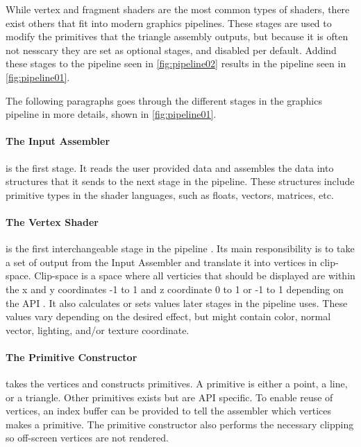 While vertex and fragment shaders are the most common types of shaders, there exist others that fit into modern graphics pipelines.
These stages are used to modify the primitives that the triangle assembly outputs, but because it is often not nesscary they are set as optional stages, and disabled per default.
Addind these stages to the pipeline seen in \cref{fig:pipeline02} results in the pipeline seen in \cref{fig:pipeline01}.



The following paragraphs goes through the different stages in the graphics pipeline in more details, shown in \cref{fig:pipeline01}.

\paragraph{The Input Assembler} is the first stage. 
It reads the user provided data and assembles the data into structures that it sends to the next stage in the pipeline. 
These structures include primitive types in the shader languages, such as floats, vectors, matrices, etc.

\paragraph{The Vertex Shader} is the first interchangeable stage in the pipeline .
Its main responsibility is to take a set of output from the Input Assembler and translate it into vertices in clip-space.
Clip-space is a space where all verticies that should be displayed are within the x and y coordinates -1 to 1 and z coordinate 0 to 1 or -1 to 1 depending on the \gls{API} .
It also calculates or sets values later stages in the pipeline uses.
These values vary depending on the desired effect, but might contain color, normal vector, lighting, and/or texture coordinate.

\paragraph{The Primitive Constructor} takes the vertices and constructs primitives.
A primitive is either a point, a line, or a triangle.
Other primitives exists but are \gls{API} specific.
To enable reuse of vertices, an index buffer can be provided to tell the assembler which vertices makes a primitive.
The primitive constructor also performs the necessary clipping so off-screen vertices are not rendered.

